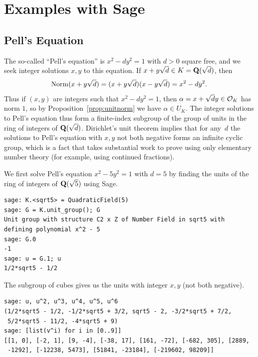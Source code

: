 \section{Examples with Sage}
\subsection{Pell's Equation}\label{sec:pell}
The so-called ``Pell's equation'' is $x^2-dy^2 = 1$ with $d>0$ square
free, and we seek integer solutions $x,y$ to this equation.  If
$x+y\sqrt{d}\in K = \mathbf{Q}(\sqrt{d})$, then
$$
  \operatorname{Norm}(x+y\sqrt{d}) = (x+y\sqrt{d})(x-y\sqrt{d}) = x^2 -dy^2.
$$ 
Thus if $(x,y)$ are integers such that $x^2 - d y^2 = 1$, then $\alpha
= x + \sqrt{d}y \in \mathcal{O}_K$ has norm $1$, so by
Proposition~\ref{prop:unitnorm} we have $\alpha \in U_K$.  The integer
solutions to Pell's equation thus form a finite-index subgroup of the
group of units in the ring of integers of $\mathbf{Q}(\sqrt{d})$.  Dirichlet's
unit theorem implies that for any~$d$ the solutions to Pell's equation
with $x,y$ not both negative forms an infinite cyclic group, which is
a fact that takes substantial work to prove using only elementary
number theory (for example, using continued fractions).

We first solve Pell's equation $x^2 - 5y^2 = 1$ with $d=5$ by finding
the units of the ring of integers of $\mathbf{Q}(\sqrt{5})$ using Sage.

\begin{lstlisting}
sage: K.<sqrt5> = QuadraticField(5)
sage: G = K.unit_group(); G
Unit group with structure C2 x Z of Number Field in sqrt5 with 
defining polynomial x^2 - 5
sage: G.0
-1
sage: u = G.1; u
1/2*sqrt5 - 1/2
\end{lstlisting}

The subgroup of cubes gives us the units with integer $x,y$ (not both negative).

\begin{lstlisting}
sage: u, u^2, u^3, u^4, u^5, u^6
(1/2*sqrt5 - 1/2, -1/2*sqrt5 + 3/2, sqrt5 - 2, -3/2*sqrt5 + 7/2, 
 5/2*sqrt5 - 11/2, -4*sqrt5 + 9)
sage: [list(v^i) for i in [0..9]]
[[1, 0], [-2, 1], [9, -4], [-38, 17], [161, -72], [-682, 305], [2889, 
 -1292], [-12238, 5473], [51841, -23184], [-219602, 98209]]
\end{lstlisting}


